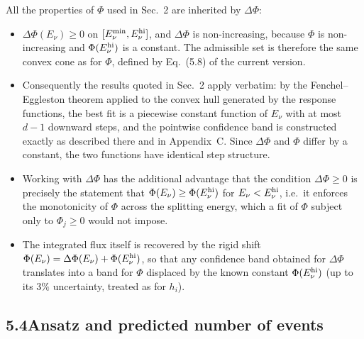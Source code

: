 \documentclass[11pt,a4paper]{article}
\newcommand{\Ev}{E_\nu}
\newcommand{\Etwo}{E_\nu^{\rm hi}}
\newcommand{\Emin}{E_\nu^{\rm min}}
\newcommand{\dPhi}{\Delta\Phi}
\begin{document}
All the properties of $\Phi$ used in Sec.~2 are inherited by $\dPhi$:
\begin{itemize}\itemsep1pt
\item $\dPhi(\Ev)\ge0$ on $[\Emin,\Etwo]$, and $\dPhi$ is non-increasing, because $\Phi$ is
non-increasing and $\Phi(\Etwo)$ is a constant. The admissible set is therefore the same convex
cone as for $\Phi$, defined by Eq.~(5.8) of the current version.
\item Consequently the results quoted in Sec.~2 apply verbatim: by the Fenchel--Eggleston
theorem applied to the convex hull generated by the response functions, the best fit is a
piecewise constant function of $\Ev$ with at most $d-1$ downward steps, and the pointwise
confidence band is constructed exactly as described there and in Appendix~C. Since
$\dPhi$ and $\Phi$ differ by a constant, the two functions have identical step structure.
\item Working with $\dPhi$ has the additional advantage that the condition $\dPhi\ge0$ is
precisely the statement that $\Phi(\Ev)\ge\Phi(\Etwo)$ for $\Ev<\Etwo$, i.e.\ it enforces the
monotonicity of $\Phi$ across the splitting energy, which a fit of $\Phi$ subject only to
$\Phi_j\ge0$ would not impose.
\item The integrated flux itself is recovered by the rigid shift
$\Phi(\Ev)=\dPhi(\Ev)+\Phi(\Etwo)$, so that any confidence band obtained for $\dPhi$ translates
into a band for $\Phi$ displaced by the known constant $\Phi(\Etwo)$ (up to its $3\%$
uncertainty, treated as for $h_i$).
\end{itemize}

\subsection*{5.4\quad Ansatz and predicted number of events}
\end{document}
